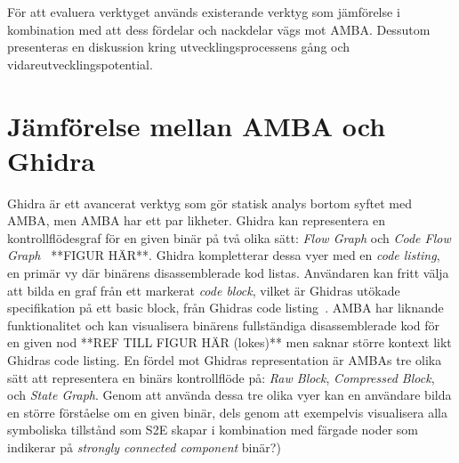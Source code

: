 För att evaluera verktyget används existerande verktyg som jämförelse i
kombination med att dess fördelar och nackdelar vägs mot AMBA. Dessutom
presenteras en diskussion kring utvecklingsprocessens gång och
vidareutvecklingspotential. 

\section{Jämförelse mellan AMBA och Ghidra}
Ghidra är ett avancerat verktyg som gör statisk analys bortom syftet med AMBA,
men AMBA har ett par likheter. Ghidra kan representera en
kontrollflödesgraf för en given binär på två olika sätt: \textit{Flow
Graph} och \textit{Code Flow Graph}~\cite{ghidra_website} **FIGUR
HÄR**. Ghidra kompletterar dessa vyer
med en \textit{code listing}, en primär vy där binärens
disassemblerade kod listas. Användaren kan fritt välja att bilda en
graf från ett markerat \textit{code block}, vilket är Ghidras utökade
specifikation på ett basic block, från Ghidras code
listing~\cite{ghidra_website}. 
AMBA har liknande funktionalitet och kan visualisera binärens
fullständiga
disassemblerade kod för en given nod **REF TILL FIGUR HÄR (lokes)**
men saknar större kontext likt Ghidras code
listing. En fördel mot Ghidras representation är AMBAs tre olika sätt
att
representera en binärs kontrollflöde på: \textit{Raw Block},
\textit{Compressed Block}, och \textit{State Graph}. 
Genom att använda dessa tre olika vyer kan en användare bilda en
större
förståelse om en given binär, dels genom att exempelvis visualisera
alla symboliska tillstånd som
S2E skapar i kombination med färgade noder som indikerar på
\textit{strongly connected
component}%
binär?)








